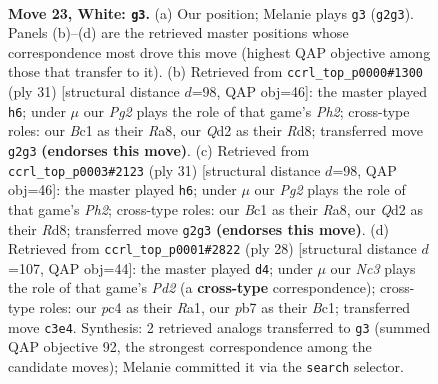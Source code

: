 \documentclass[11pt]{article}
\begin{document}
\clearpage

\begin{figure}[p]\centering
\begin{subfigure}{0.46\textwidth}\centering
\resizebox{\linewidth}{!}{%
\newchessgame
\chessboard[
  setfen={r2q3r/ppp1b1k1/n4pp1/3P3p/P1p2Nb1/2N5/RPPQRPPP/2B3K1 w - - 3 23},
  showmover=false,
  pgfstyle=straightmove, color=movearrow, markmove={g2-g3}
]}
\caption{}
\end{subfigure}\hfill
\begin{subfigure}{0.46\textwidth}\centering
\resizebox{\linewidth}{!}{%
\newchessgame
\chessboard[
  setfen={r2r2k1/pp1qbppp/2n2n2/8/N2p1B1P/5BP1/PP2PP2/2RQ1RK1 b - - 1 16},
  showmover=false,
  pgfstyle=straightmove, color=movearrow, markmove={h7-h6}
]}
\caption{}
\end{subfigure}
\\[4pt]
\begin{subfigure}{0.46\textwidth}\centering
\resizebox{\linewidth}{!}{%
\newchessgame
\chessboard[
  setfen={r2r2k1/pp1qbppp/2n2n2/8/N2p1B1P/5BP1/PP2PP2/2RQ1RK1 b - - 1 16},
  showmover=false,
  pgfstyle=straightmove, color=movearrow, markmove={h7-h6}
]}
\caption{}
\end{subfigure}\hfill
\begin{subfigure}{0.46\textwidth}\centering
\resizebox{\linewidth}{!}{%
\newchessgame
\chessboard[
  setfen={r2q1rk1/2n2pbp/2ppb1p1/p7/P7/1N3N1P/1PPP1PP1/R1BQR1K1 w - - 1 15},
  showmover=false,
  pgfstyle=straightmove, color=movearrow, markmove={d2-d4}
]}
\caption{}
\end{subfigure}
\caption{\textbf{Move 23, White: \texttt{g3}.} (a) Our position; Melanie plays \texttt{g3} (\texttt{g2g3}). Panels (b)--(d) are the retrieved master positions whose correspondence most drove this move (highest QAP objective among those that transfer to it). (b) Retrieved from \texttt{ccrl\_top\_p0000\#1300} (ply 31) [structural distance $d$=98, QAP obj=46]: the master played \texttt{h6}; under $\mu$ our \emph{Pg2} plays the role of that game's \emph{Ph2}; cross-type roles: our \emph{B}c1 as their \emph{R}a8, our \emph{Q}d2 as their \emph{R}d8; transferred move \texttt{g2g3} \textbf{(endorses this move)}. (c) Retrieved from \texttt{ccrl\_top\_p0003\#2123} (ply 31) [structural distance $d$=98, QAP obj=46]: the master played \texttt{h6}; under $\mu$ our \emph{Pg2} plays the role of that game's \emph{Ph2}; cross-type roles: our \emph{B}c1 as their \emph{R}a8, our \emph{Q}d2 as their \emph{R}d8; transferred move \texttt{g2g3} \textbf{(endorses this move)}. (d) Retrieved from \texttt{ccrl\_top\_p0001\#2822} (ply 28) [structural distance $d$=107, QAP obj=44]: the master played \texttt{d4}; under $\mu$ our \emph{Nc3} plays the role of that game's \emph{Pd2} (a \textbf{cross-type} correspondence); cross-type roles: our \emph{p}c4 as their \emph{R}a1, our \emph{p}b7 as their \emph{B}c1; transferred move \texttt{c3e4}. Synthesis: 2 retrieved analogs transferred to \texttt{g3} (summed QAP objective 92, the strongest correspondence among the candidate moves); Melanie committed it via the \texttt{search} selector.}
\label{fig:thought-m44}
\end{figure}
\end{document}
